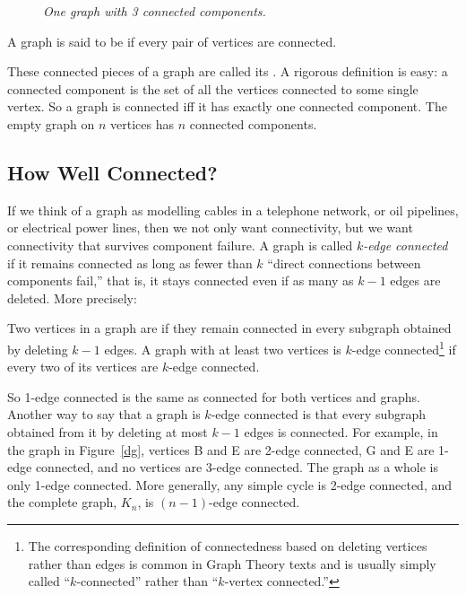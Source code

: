 \begin{figure}[htbp] 
\caption{\em One graph with 3 connected components.}
\label{fig:3comp}
\end{figure}

\begin{definition}
A graph is said to be  if every pair of vertices are
connected.
\end{definition}

These connected pieces of a graph are called its .  A rigorous definition is easy: a connected component is the
set of all the vertices connected to some single vertex.  So a graph is
connected iff it has exactly one connected component.  The empty graph on
$n$ vertices has $n$ connected components.

\subsection{How Well Connected?}

If we think of a graph as modelling cables in a telephone network, or oil
pipelines, or electrical power lines, then we not only want connectivity,
but we want connectivity that survives component failure.  A graph is
called \emph{$k$-edge connected} if it remains connected as long as fewer
than $k$ ``direct connections between components fail,'' that is, it stays
connected even if as many as $k-1$ edges are deleted.  More precisely:
\begin{definition}
  Two vertices in a graph are  if they remain
  connected in every subgraph obtained by deleting $k-1$ edges.  A graph
  with at least two vertices is $k$-edge connected\footnote{The
    corresponding definition of connectedness based on deleting vertices
    rather than edges is common in Graph Theory texts and is usually
    simply called ``$k$-connected'' rather than ``$k$-vertex connected.''}
  if every two of its vertices are $k$-edge connected.
\end{definition}
So 1-edge connected is the same as connected for both vertices and graphs.
Another way to say that a graph is $k$-edge connected is that every
subgraph obtained from it by deleting at most $k-1$ edges is connected.
For example, in the graph in Figure~\ref{dg}, vertices B and E are 2-edge
connected, G and E are 1-edge connected, and no vertices are 3-edge
connected.  The graph as a whole is only 1-edge connected.  More
generally, any simple cycle is 2-edge connected, and the complete graph,
$K_n$, is $(n-1)$-edge connected.

